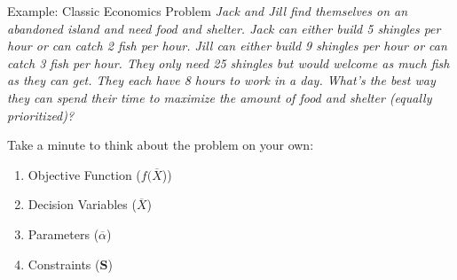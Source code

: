 \documentclass[10pt, aspectratio=169]{beamer}
\begin{document}
\begin{frame}[t]{Example: Classic Economics Problem}
    \textit{Jack and Jill find themselves on an abandoned island and need food and shelter. Jack can either build 5 shingles per hour or can catch 2 fish per hour. Jill can either build 9 shingles per hour or can catch 3 fish per hour. They only need 25 shingles but would welcome as much fish as they can get. They each have 8 hours to work in a day. What's the best way they can spend their time to maximize the amount of food and shelter (equally prioritized)?}

    \vspace{1.0cm}
    
    Take a minute to think about the problem on your own:
    \begin{enumerate}
        \item Objective Function ($f(\overline{X}$))
        \item Decision Variables ($\overline{X}$)
        \item Parameters ($\overline{\alpha}$)
        \item Constraints ($\textbf{S}$)
    \end{enumerate}
\end{frame}
\end{document}
